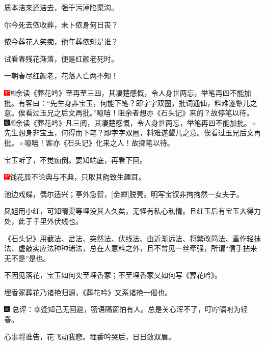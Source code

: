 质本洁来还洁去，强于污淖陷渠沟。

尔今死去侬收葬，未卜侬身何日丧？

侬今葬花人笑痴，他年葬侬知是谁？

试看春残花渐落，便是红颜老死时。

一朝春尽红颜老，花落人亡两不知！

{{\includegraphics[width=3mm]{../Images/00002}\includegraphics[width=3mm]{../Images/00011}\footnotesize \kaishu 余读《葬花吟》至再至三四，其凄楚感慨，令人身世两忘，举笔再四不能加批。有客曰：“先生身非宝玉，何能下笔？即字字双圈，批词通仙，料难遂颦儿之意。俟看过玉兄之后文再批。”噫嘻！阻余者想亦《石头记》来的？故停笔以待。　\includegraphics[width=3mm]{../Images/00004}\includegraphics[width=3mm]{../Images/00010}\footnotesize \kaishu 余读《葬花吟》凡三阅，其凄楚感慨，令人身世两忘，举笔再四不能加批。{$\diamond$}先生想身非宝玉，何得而下笔？即字字双圈，料难遂颦儿之意。俟看过玉兄后文再批。{$\diamond$}噫嘻！客亦《石头记》化来之人！故掷笔以待。}}

宝玉听了，不觉痴倒。要知端底，再看下回。

{\includegraphics[width=3mm]{../Images/00002}饯花辰不论典与不典，只取其韵致生趣耳。}

{池边戏蝶，偶尔适兴；亭外急智，{[}金蝉{]}脱壳。明写宝钗非拘拘然一女夫子。}

{凤姐用小红，可知晴雯等埋没其人久矣，无怪有私心私情。且红玉后有宝玉大得力处，此于千里外伏线也。}

{《石头记》用截法、岔法、突然法、伏线法、由近渐远法、将繁改简法、重作轻抹法、虚敲实应法种种诸法，总在人意料之外，且不曾见一丝牵强，所谓“信手拈来无不是”是也。}

{不因见落花，宝玉如何突至埋香冢；不至埋香冢又如何写《葬花吟》。}

{埋香冢葬花乃诸艳归源，《葬花吟》又系诸艳一偈也。}

{\includegraphics[width=3mm]{../Images/00005}  \kaishu 总评：幸逢知己无回避，密语隔窗怕有人。总是关心浑不了，叮咛嘱咐为轻春。}

{心事将谁告，花飞动我悲。埋香吟哭后，日日敛双眉。}